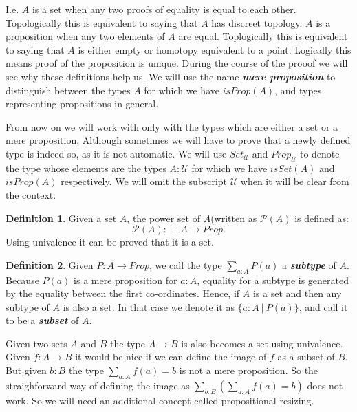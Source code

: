 \documentclass[11pt]{article}
\theoremstyle{definition}
\newtheorem{definition}{Definition}[section]
\theoremstyle{plain}
\theoremstyle{remark}
\newcommand{\U}{\mathscr{U}}
\newcommand{\Po}{\mathscr{P}}
\begin{document}
I.e. $A$ is a set when any two proofs of equality is equal to each other. Topologically this 
is equivalent to saying that $A$ has discreet topology. $A$ is a proposition when any two 
elements of $A$ are equal. Toplogically this is equivalent to saying that $A$ is either empty
or homotopy equivalent to a point. Logically this means proof of the proposition is unique. 
During the course of the prooof we will see why these definitions help us. We will use the name 
\textbf{\textit{mere proposition}} to distinguish between the types $A$ for which we have
$isProp(A)$, and types representing propositions in general. \smallskip

From now on we will work with only with the types which are either a set or a mere 
proposition. Although sometimes we will have to prove that a newly defined type is indeed 
so, as it is not automatic. We will use $Set_{\U}$ and $Prop_{\U}$ to denote the type
whose elements are the types $A : \U$ for which we have $isSet(A)$ and $isProp(A)$ 
respectively. We will omit the subscript $\U$ when it will be clear from the context. 

\begin{definition}\label{D:Power set}
Given a set $A$, the power set of $A$(written as $\Po (A)$ is defined as:
\[ \Po (A) :\equiv A \to Prop.\]
Using univalence it can be proved that it is a set.
\end{definition}

\begin{definition}\label{D:Subset}
Given $P : A \to Prop$, we call the type $\sum_{a : A}  P(a)$ a \textbf{\textit{subtype}}
of $A$. Because $P(a)$ is a mere proposition for $a : A$, equality for a subtype is generated by 
the equality between the first co-ordinates. Hence, if $A$ is a set and then any subtype of $A$ 
is also a set. In that case we denote it as ${\{ a : A\ |\ P(a) \}}$, and call it to be a 
\textbf{\textit{subset}} of $A$.
\end{definition}

Given two sets $A$ and $B$ the type $A \to B$ is also becomes a set using univalence. Given
$f : A \to B$ it would be nice if we can define the image of $f$ as a subset of $B$. But
given $b : B$ the type $\sum_{a : A} f(a) = b$ is not a mere proposition. So the 
straighforward way of defining the image as $\sum_{b : B} (\sum_{a : A} f(a) = b)$ does not
work. So we will need an additional concept called propositional resizing.
\end{document}
